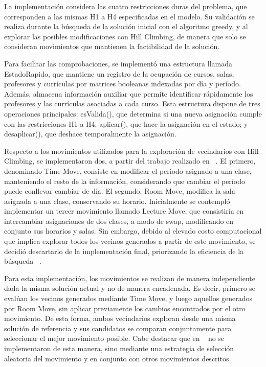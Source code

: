 \documentclass[letter, 10pt]{article}
\begin{document}
La implementaci\'on considera las cuatro restricciones duras del problema, que corresponden a las mismas H1 a H4 especificadas en el modelo. Su validaci\'on se realiza durante la b\'usqueda de la soluci\'on inicial con el algoritmo greedy, y al explorar las posibles modificaciones con Hill Climbing, de manera que solo se consideran movimientos que mantienen la factibilidad de la soluci\'on.

Para facilitar las comprobaciones, se implement\'o una estructura llamada EstadoRapido, que mantiene un registro de la ocupaci\'on de cursos, salas, profesores y curr\'iculas por matrices booleanas indexadas por d\'ia y per\'iodo. Adem\'as, almacena informaci\'on auxiliar que permite identificar r\'apidamente los profesores y las curr\'iculas asociadas a cada curso. Esta estructura dispone de tres operaciones principales: esValida(), que determina si una nueva asignaci\'on cumple con las restricciones H1 a H4; aplicar(), que hace la asignaci\'on en el estado; y desaplicar(), que deshace temporalmente la asignaci\'on.

Respecto a los movimientos utilizados para la exploraci\'on de vecindarios con Hill Climbing, se implementaron dos, a partir del trabajo realizado en ~\cite{Feutrier2023Landscape}. El primero, denominado Time Move, consiste en modificar el periodo asignado a una clase, manteniendo el resto de la informaci\'on, considerando que cambiar el per\'iodo puede conllevar cambiar de d\'ia. El segundo, Room Move, modifica la sala asignada a una clase, conservando su horario. Inicialmente se contempl\'o implementar un tercer movimiento llamado Lecture Move, que consistir\'ia en intercambiar asignaciones de dos clases, a modo de swap, modificando en conjunto sus horarios y salas. Sin embargo, debido al elevado costo computacional que implica explorar todos los vecinos generados a partir de este movimiento, se decidi\'o descartarlo de la implementaci\'on final, priorizando la eficiencia de la b\'usqueda ~\cite{Feutrier2023Landscape}.

Para esta implementaci\'on, los movimientos se realizan de manera independiente dada la misma soluci\'on actual y no de manera encadenada. Es decir, primero se eval\'uan los vecinos generados mediante Time Move, y luego aquellos generados por Room Move, sin aplicar previamente los cambios encontrados por el otro movimiento. De esta forma, ambos vecindarios exploran desde una misma soluci\'on de referencia y sus candidatos se comparan conjuntamente para seleccionar el mejor movimiento posible. Cabe destacar que en ~\cite{Feutrier2023Landscape} no se implementaron de esta manera, sino mediante una estrategia de selecci\'on aleatoria del movimiento y en conjunto con otros movimientos descritos.
\end{document}
